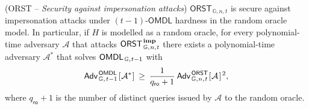 \documentclass{iacrtrans}
\begin{document}
\noindent

\begin{thm}\label{theorem_orst_security}
\textup{(\textsf{ORST} --
\textit{Security against impersonation attacks})}
$\mathsf{ORST}_{\hspace{1pt}\mathbb{G}, n, t}$
is secure against impersonation attacks
under $(t-1)$-$\mathsf{OMDL}$ hardness
in the random oracle model.
In particular, if $H$ is modelled as a random oracle,
for every polynomial-time adversary $\mathcal{A}$ that attacks
$\mathsf{ORST}
	_{\hspace{1pt}\mathbb{G},\hspace{0.5pt} n,\hspace{0.5pt} t}
	^\mathbf{\hspace{1pt}imp}
$
there exists a polynomial-time
adversary $\mathcal{A}^*$ that solves
$\mathsf{OMDL}
	_{\hspace{1pt}\mathbb{G},\hspace{0.5pt} t-1}
$
with
\vspace{5pt}
\begin{equation}\label{orst_security_bound}
	\mathsf{Adv}
		_{\hspace{1pt}\mathbb{G},\hspace{1pt} t-1}
		^{\hspace{1pt}\mathsf{OMDL}}
		\hspace{1pt}
		[
			\hspace{0.5pt}
			\mathcal{A}^*
			\hspace{0.5pt}
		]
	\hspace{2pt}
	\ge
	\hspace{2pt}
	\frac{1}{q_{\mathsf{ro}} + 1}
	\hspace{2pt}
	\mathsf{Adv}
		_{\hspace{1pt}\mathbb{G}, \hspace{0.5pt}n, \hspace{0.5pt}t}
		^{\hspace{1pt}\mathsf{ORST}}
		\hspace{0.5pt}
		[
			\hspace{0.5pt}
			\mathcal{A}
			\hspace{1pt}
		] ^ {\hspace{1pt}2},
\vspace{5pt}
\end{equation}
where $q_\mathsf{ro} + 1$ is the number of distinct queries
issued by $\mathcal{A}$ to the random oracle.
\end{thm}
\end{document}
